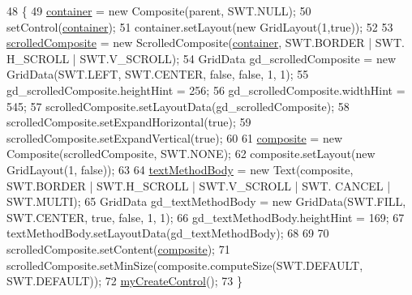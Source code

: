 \begin{DoxyCode}
48                                                 \{
49         \hyperlink{classit_1_1isislab_1_1masonhelperdocumentation_1_1mason_1_1wizards_1_1_i___start_information_page_ae9856c6dd582204ec11d79886488fe94}{container} = \textcolor{keyword}{new} Composite(parent, SWT.NULL);
50         setControl(\hyperlink{classit_1_1isislab_1_1masonhelperdocumentation_1_1mason_1_1wizards_1_1_i___start_information_page_ae9856c6dd582204ec11d79886488fe94}{container});
51         container.setLayout(\textcolor{keyword}{new} GridLayout(1,\textcolor{keyword}{true}));
52         
53         \hyperlink{classit_1_1isislab_1_1masonhelperdocumentation_1_1mason_1_1wizards_1_1_i___start_information_page_a78967a339694c8dd82848006bf6526b6}{scrolledComposite} = \textcolor{keyword}{new} ScrolledComposite(\hyperlink{classit_1_1isislab_1_1masonhelperdocumentation_1_1mason_1_1wizards_1_1_i___start_information_page_ae9856c6dd582204ec11d79886488fe94}{container}, SWT.BORDER | SWT.
      H\_SCROLL | SWT.V\_SCROLL);
54         GridData gd\_scrolledComposite = \textcolor{keyword}{new} GridData(SWT.LEFT, SWT.CENTER, \textcolor{keyword}{false}, \textcolor{keyword}{false}, 1, 1);
55         gd\_scrolledComposite.heightHint = 256;
56         gd\_scrolledComposite.widthHint = 545;
57         scrolledComposite.setLayoutData(gd\_scrolledComposite);
58         scrolledComposite.setExpandHorizontal(\textcolor{keyword}{true});
59         scrolledComposite.setExpandVertical(\textcolor{keyword}{true});
60         
61         \hyperlink{classit_1_1isislab_1_1masonhelperdocumentation_1_1mason_1_1wizards_1_1_i___start_information_page_a4ab7b99c568dbe299dfcd34acb6ad97c}{composite} = \textcolor{keyword}{new} Composite(scrolledComposite, SWT.NONE);
62         composite.setLayout(\textcolor{keyword}{new} GridLayout(1, \textcolor{keyword}{false}));
63         
64         \hyperlink{classit_1_1isislab_1_1masonhelperdocumentation_1_1mason_1_1wizards_1_1_i___start_information_page_a03f14d0a5df3cc1a27520083646630c5}{textMethodBody} = \textcolor{keyword}{new} Text(composite, SWT.BORDER | SWT.H\_SCROLL | SWT.V\_SCROLL | SWT.
      CANCEL | SWT.MULTI);
65         GridData gd\_textMethodBody = \textcolor{keyword}{new} GridData(SWT.FILL, SWT.CENTER, \textcolor{keyword}{true}, \textcolor{keyword}{false}, 1, 1);
66         gd\_textMethodBody.heightHint = 169;
67         textMethodBody.setLayoutData(gd\_textMethodBody);
68         
69     
70         scrolledComposite.setContent(\hyperlink{classit_1_1isislab_1_1masonhelperdocumentation_1_1mason_1_1wizards_1_1_i___start_information_page_a4ab7b99c568dbe299dfcd34acb6ad97c}{composite});
71         scrolledComposite.setMinSize(composite.computeSize(SWT.DEFAULT, SWT.DEFAULT));
72         \hyperlink{classit_1_1isislab_1_1masonhelperdocumentation_1_1mason_1_1wizards_1_1_i___start_information_page_a11ff2fb4c6af0ac2cc873e0b56553c55}{myCreateControl}();
73     \}
\end{DoxyCode}


